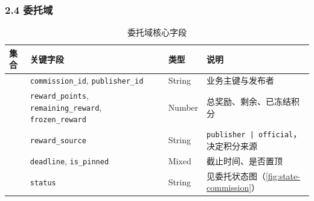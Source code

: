 \documentclass[a4paper,12pt]{article}
\begin{document}
\subsubsection*{2.4 委托域}

\begin{table}[H]
  \centering
  \caption{委托域核心字段}
  \label{tab:schema-commission}
  \scriptsize
  \setlength{\tabcolsep}{4pt}
  \renewcommand{\arraystretch}{1.18}
  \begin{tabularx}{\textwidth}{>{\raggedright\arraybackslash}p{3.0cm} >{\raggedright\arraybackslash}p{4.1cm} >{\raggedright\arraybackslash}p{1.5cm} >{\raggedright\arraybackslash}X}
      \toprule
      \textbf{集合}                                       & \textbf{关键字段}                                                                                               & \textbf{类型} & \textbf{说明}                                                                                                                        \\
      \midrule
      \multirow{5}{3.0cm}{\centering\ttfamily commissions} & \texttt{commission\_id}, \texttt{publisher\_id}                                                             & String      & 业务主键与发布者                                                                                                                           \\
                                                        & \texttt{reward\_points}, \texttt{remaining\_reward}, \linebreak \texttt{frozen\_reward}                     & Number      & 总奖励、剩余、已冻结积分                                                                                                                       \\
                                                        & \texttt{reward\_source}                                                                                     & String      & \texttt{publisher | official}，决定积分来源                                                                                               \\
                                                        & \texttt{deadline}, \texttt{is\_pinned}                                                                      & Mixed       & 截止时间、是否置顶                                                                                                                          \\
                                                        & \texttt{status}                                                                                             & String      & 见委托状态图（\ref{fig:state-commission}）                                                                                                 \\

\end{tabularx}
\end{table}
\end{document}
